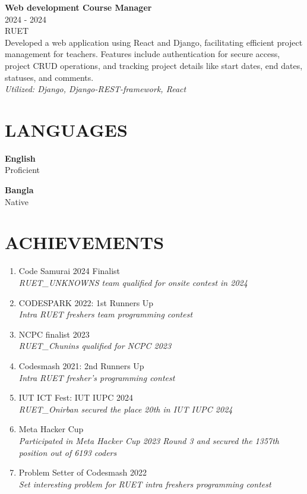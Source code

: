 \documentclass[a4paper,10pt]{article}
\begin{document}
\begin{multicols}{2}
\textbf{Web development Course Manager} \\
2024 - 2024 \\
RUET \\
Developed a web application using React and Django, facilitating efficient project management for teachers. Features include authentication for secure access, project CRUD operations, and tracking project details like start dates, end dates, statuses, and comments. \\
\textit{Utilized: Django, Django-REST-framework, React}

\section*{LANGUAGES}
\textbf{English} \\
Proficient

\textbf{Bangla} \\
Native

\section*{ACHIEVEMENTS}
\begin{enumerate}[noitemsep]
    \item Code Samurai 2024 Finalist \\
    \textit{RUET\_UNKNOWNS team qualified for onsite contest in 2024}
    \item CODESPARK 2022: 1st Runners Up \\
    \textit{Intra RUET freshers team programming contest}
    \item NCPC finalist 2023 \\
    \textit{RUET\_Chunins qualified for NCPC 2023}
    \item Codesmash 2021: 2nd Runners Up \\
    \textit{Intra RUET fresher’s programming contest}
    \item IUT ICT Fest: IUT IUPC 2024 \\
    \textit{RUET\_Onirban secured the place 20th in IUT IUPC 2024}
    \item Meta Hacker Cup \\
    \textit{Participated in Meta Hacker Cup 2023 Round 3 and secured the 1357th position out of 6193 coders}
    \item Problem Setter of Codesmash 2022 \\
    \textit{Set interesting problem for RUET intra freshers programming contest}
\end{enumerate}


\end{multicols}
\end{document}
